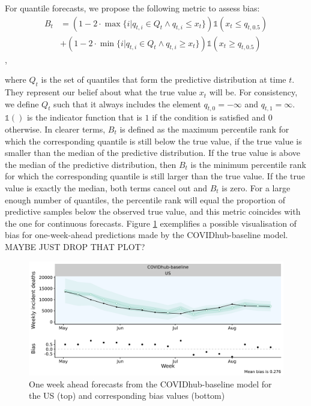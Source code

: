 \documentclass[
]{book}
\begin{document}
For quantile forecasts, we propose the following metric to assess bias:
\begin{align*}
  B_t &= (1 - 2 \cdot \max \{i | q_{t,i} \in Q_t \land q_{t,i} \leq x_t\}) \mathbb{1}( x_t \leq q_{t, 0.5}) \\
  &+ (1 - 2 \cdot \min \{i | q_{t,i} \in Q_t \land q_{t,i} \geq x_t\}) \mathbb{1}( x_t \geq q_{t, 0.5})
\end{align*},

where \(Q_t\) is the set of quantiles that form the predictive distribution at time \(t\). They represent our belief about what the true value \(x_t\) will be. For consistency, we define \(Q_t\) such that it always includes the element \(q_{t, 0} = - \infty\) and \(q_{t,1} = \infty\). \(\mathbb{1}()\) is the indicator function that is \(1\) if the condition is satisfied and \(0\) otherwise. In clearer terms, \(B_t\) is defined as the maximum percentile rank for which the corresponding quantile is still below the true value, if the true value is smaller than the median of the predictive distribution. If the true value is above the median of the predictive distribution, then \(B_t\) is the minimum percentile rank for which the corresponding quantile is still larger than the true value. If the true value is exactly the median, both terms cancel out and \(B_t\) is zero. For a large enough number of quantiles, the percentile rank will equal the proportion of predictive samples below the observed true value, and this metric coincides with the one for continuous forecasts. Figure \ref{fig:bias-example} exemplifies a possible visualisation of bias for one-week-ahead predictions made by the COVIDhub-baseline model. MAYBE JUST DROP THAT PLOT?

\begin{figure}
\includegraphics[width=1\linewidth]{../visualisation/chapter-3-evaluation/bias_example} \caption{One week ahead forecasts from the COVIDhub-baseline model for the US (top) and corresponding bias values (bottom)}\label{fig:bias-example}
\end{figure}
\end{document}
